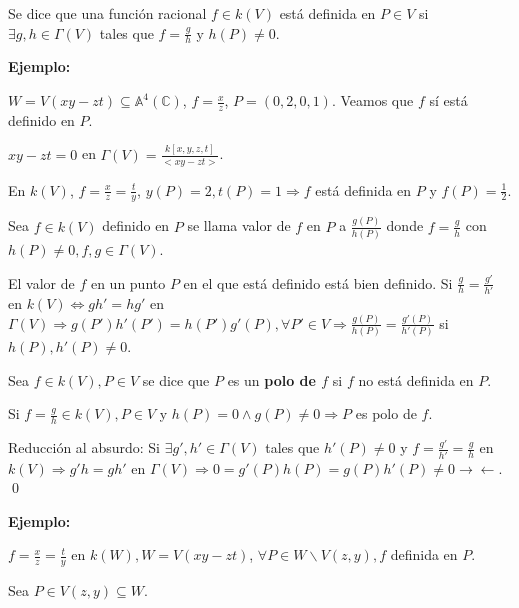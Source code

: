 \begin{Def}
Se dice que una función racional $f\in k(V)$ está definida en $P\in V$ si $\exists g,h\in \Gamma(V)$ tales que $f=\frac{g}{h}$ y $h(P)\neq 0$.
\end{Def}

\textbf{Ejemplo: }

$W=V(xy-zt)\subseteq \mathbb{A}^4(\mathbb{C})$, $f=\frac{x}{z}$, $P=(0,2,0,1)$. Veamos que $f$ sí está definido en $P$. 

$xy-zt=0$ en $\Gamma(V)=\frac{k[x,y,z,t]}{<xy-zt>}$.

En $k(V)$, $f=\frac{x}{z}=\frac{t}{y}$, $y(P)=2, t(P)=1 \Rightarrow f$ está definida en $P$ y $f(P)=\frac{1}{2}$.

\begin{Def}
Sea $f\in k(V)$ definido en $P$ se llama valor de $f$ en $P$ a $\frac{g(P)}{h(P)}$ donde $f=\frac{g}{h}$ con $h(P)\neq 0, f,g\in \Gamma(V)$.
\end{Def}

\begin{nota}
El valor de $f$ en un punto $P$ en el que está definido está bien definido. Si $\frac{g}{h}=\frac{g'}{h'}$ en $k(V) \Leftrightarrow gh'=hg'$ en $\Gamma(V) \Rightarrow g(P')h'(P')=h(P')g'(P), \forall P'\in V \Rightarrow \frac{g(P)}{h(P)}=\frac{g'(P)}{h'(P)}$ si $h(P),h'(P)\neq 0$.
\end{nota}

\begin{Def}
Sea $f\in k(V), P\in V$ se dice que $P$ es un \textbf{polo de $f$} si $f$ no está definida en $P$. 
\end{Def}

\begin{nota}
Si $f=\frac{g}{h} \in k(V), P\in V$ y $h(P)=0 \wedge g(P)\neq 0 \Rightarrow P$ es polo de $f$.

\begin{Dem}
Reducción al absurdo: Si $\exists g',h'\in \Gamma(V)$ tales que $h'(P)\neq 0$ y $f=\frac{g'}{h'}=\frac{g}{h}$ en $k(V) \Rightarrow g'h=gh'$ en $\Gamma(V) \Rightarrow 0=g'(P)h(P)=g(P)h'(P)\neq 0  \rightarrow \leftarrow$. \qed
\end{Dem}
\end{nota}

\textbf{Ejemplo: }

 $f=\frac{x}{z}=\frac{t}{y}$ en $k(W), W=V(xy-zt)$, $\forall P \in W \backslash V(z,y), f$ definida en $P$.

Sea $P\in V(z,y)\subseteq W$.

